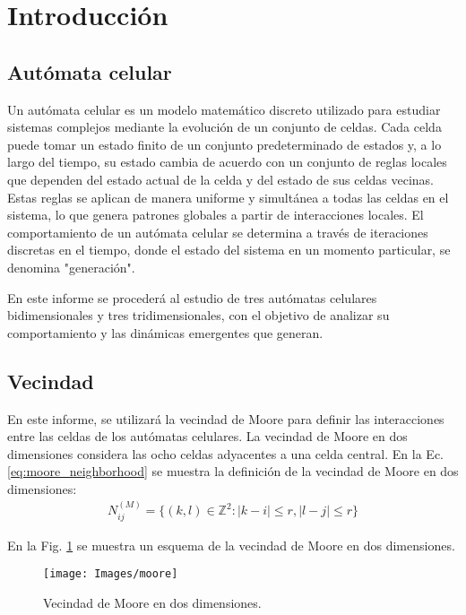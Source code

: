 \section{Introducción}
\label{sec:intro}

\subsection{Autómata celular}
\label{subsec:ac}

Un autómata celular es un modelo matemático discreto utilizado para estudiar sistemas complejos mediante la evolución de un conjunto de celdas.
Cada celda puede tomar un estado finito de un conjunto predeterminado de estados y, a lo largo del tiempo, su estado cambia de acuerdo con un conjunto de reglas locales que dependen del estado actual de la celda y del estado de sus celdas vecinas.
Estas reglas se aplican de manera uniforme y simultánea a todas las celdas en el sistema, lo que genera patrones globales a partir de interacciones locales.
El comportamiento de un autómata celular se determina a través de iteraciones discretas en el tiempo, donde el estado del sistema en un momento particular, se denomina "generación".

En este informe se procederá al estudio de tres autómatas celulares bidimensionales y tres tridimensionales, con el objetivo de analizar su comportamiento y las dinámicas emergentes que generan.


\subsection{Vecindad}
\label{subsec:vecindad}
En este informe, se utilizará la vecindad de Moore para definir las interacciones entre las celdas de los autómatas celulares.
La vecindad de Moore en dos dimensiones considera las ocho celdas adyacentes a una celda central.
En la Ec.\ref{eq:moore_neighborhood} se muestra la definición de la vecindad de Moore en dos dimensiones:
\begin{equation}
    \label{eq:moore_neighborhood}
    \begin{aligned}
        N^{(M)}_{ij} = \{(k,l) \in \mathbb{Z}^2 : |k-i| \leq r, |l-j| \leq r\}
    \end{aligned}
\end{equation}

En la Fig. \ref{fig:moore} se muestra un esquema de la vecindad de Moore en dos dimensiones.
\begin{figure}[H]
    \centering
    \texttt{[image: Images/moore]}
    \caption{Vecindad de Moore en dos dimensiones.}
    \label{fig:moore}
\end{figure}

